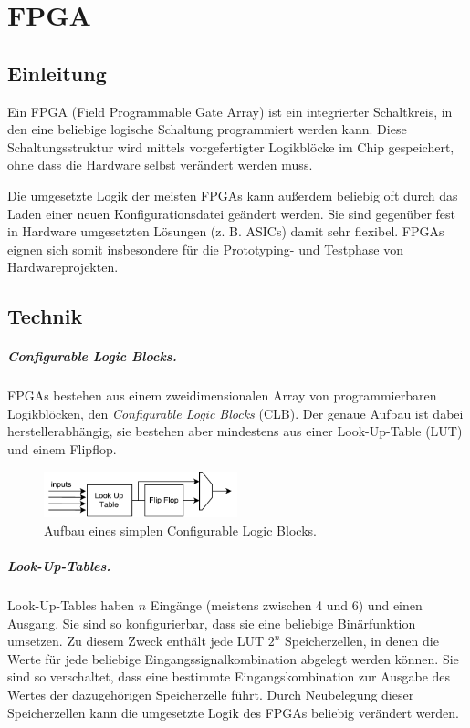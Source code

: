\chapter{FPGA} %
\label{FPGA} %

\section{Einleitung}
Ein FPGA (Field Programmable Gate Array) ist ein integrierter
Schaltkreis, in den eine beliebige logische Schaltung programmiert
werden kann. Diese Schaltungsstruktur wird mittels vorgefertigter Logikblöcke im Chip gespeichert, ohne dass die Hardware selbst verändert werden muss.

Die umgesetzte Logik der meisten FPGAs kann außerdem beliebig oft durch
das Laden einer neuen Konfigurationsdatei geändert werden. Sie sind
gegenüber fest in Hardware umgesetzten Lösungen (z. B. ASICs) damit sehr
flexibel. FPGAs eignen sich somit insbesondere für die Prototyping- und
Testphase von Hardwareprojekten.~\cite[S. 8]{SynthesisFPGA}

\section{Technik}
\paragraph{Configurable Logic Blocks.} FPGAs bestehen aus einem zweidimensionalen Array von programmierbaren Logikblöcken, den \emph{Configurable Logic Blocks} (CLB). \cite[S. 11]{Chu} Der genaue Aufbau ist dabei herstellerabhängig, sie bestehen aber mindestens aus einer Look-Up-Table (LUT) und einem Flipflop. \cite[S. 8]{SynthesisFPGA}

\begin{figure} [ht]
  \centering
  \includegraphics[width=0.5\textwidth]{Figures/clb}
  \caption{Aufbau eines simplen Configurable Logic Blocks.}
  \label{fig:clb}
\end{figure}

\paragraph{Look-Up-Tables.} Look-Up-Tables haben $n$ Eingänge (meistens zwischen 4 und 6) und einen Ausgang. Sie sind so konfigurierbar, dass sie eine beliebige Binärfunktion umsetzen. Zu diesem Zweck enthält jede LUT $2^n$ Speicherzellen, in denen die Werte für jede beliebige Eingangssignalkombination abgelegt werden können. Sie sind so verschaltet, dass eine bestimmte Eingangskombination zur Ausgabe des Wertes der dazugehörigen Speicherzelle führt. \cite[S. 12f.]{Chu} Durch Neubelegung dieser Speicherzellen kann die umgesetzte Logik des FPGAs beliebig verändert werden.

